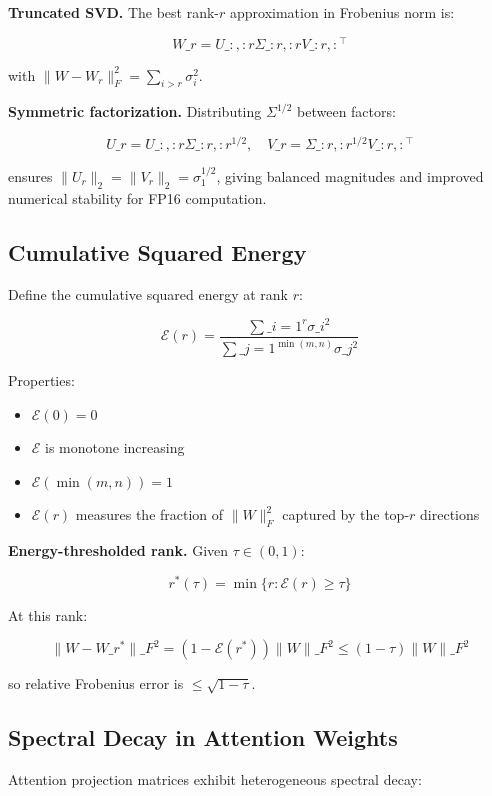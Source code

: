 \textbf{Truncated SVD.} The best rank-$r$ approximation in Frobenius norm is:

\[
W\_r = U\_{:, :r} \Sigma\_{:r, :r} V\_{:r, :}^\top
\tag{3.2}
\]

with $\|W - W_r\|_F^2 = \sum_{i > r} \sigma_i^2$.

\textbf{Symmetric factorization.} Distributing $\Sigma^{1/2}$ between factors:

\[
U\_r = U\_{:, :r} \Sigma\_{:r, :r}^{1/2}, \quad
V\_r = \Sigma\_{:r, :r}^{1/2} V\_{:r, :}^\top
\tag{3.3}
\]

ensures $\|U_r\|_2 = \|V_r\|_2 = \sigma_1^{1/2}$, giving balanced magnitudes 
and improved numerical stability for FP16 computation.

\subsection{Cumulative Squared Energy}

Define the cumulative squared energy at rank $r$:

\[
\mathcal{E}(r) = \frac{\sum\_{i=1}^{r} \sigma\_i^2}{\sum\_{j=1}^{\min(m,n)} \sigma\_j^2}
\tag{3.4}
\]

Properties:
\begin{itemize}
\item $\mathcal{E}(0) = 0$
\item $\mathcal{E}$ is monotone increasing
\item $\mathcal{E}(\min(m, n)) = 1$
\item $\mathcal{E}(r)$ measures the fraction of $\|W\|_F^2$ captured by the top-$r$ directions

\end{itemize}
\textbf{Energy-thresholded rank.} Given $\tau \in (0, 1)$:

\[
r^*(\tau) = \min\{r : \mathcal{E}(r) \geq \tau\}
\tag{3.5}
\]

At this rank:

\[
\|W - W\_{r^*}\|\_F^2 = (1 - \mathcal{E}(r^*)) \|W\|\_F^2 \leq (1 - \tau) \|W\|\_F^2
\tag{3.6}
\]

so relative Frobenius error is $\leq \sqrt{1 - \tau}$.

\subsection{Spectral Decay in Attention Weights}

Attention projection matrices exhibit heterogeneous spectral decay:

